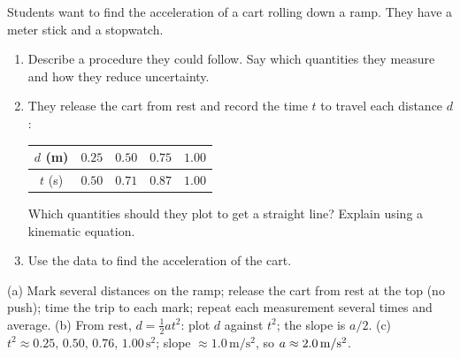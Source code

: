\begin{exo}{}
Students want to find the acceleration of a cart rolling down a ramp. They have a meter stick and a stopwatch.
\begin{enumerate}[label=(\alph*)]
\item Describe a procedure they could follow. Say which quantities they measure and how they reduce uncertainty.
\item They release the cart from rest and record the time $t$ to travel each distance $d$:
\begin{center}\begin{tabular}{c|cccc}
$d$ (m) & $0.25$ & $0.50$ & $0.75$ & $1.00$\\\hline
$t$ (s) & $0.50$ & $0.71$ & $0.87$ & $1.00$
\end{tabular}\end{center}
Which quantities should they plot to get a straight line? Explain using a kinematic equation.
\item Use the data to find the acceleration of the cart.
\end{enumerate}
\work{5cm}
\begin{solution}
(a) Mark several distances on the ramp; release the cart from rest at the top (no push); time the trip to each mark; repeat each measurement several times and average. \;(b) From rest, $d=\frac12at^2$: plot $d$ against $t^2$; the slope is $a/2$. \;(c) $t^2\approx0.25,\,0.50,\,0.76,\,1.00\,\mathrm{s^2}$; slope $\approx1.0\,\mathrm{m/s^2}$, so $a\approx2.0\,\mathrm{m/s^2}$.
\end{solution}
\end{exo}
